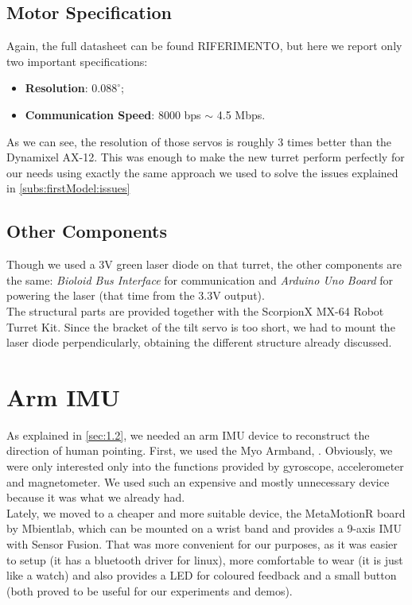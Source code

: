 \subsection{Motor Specification}
Again, the full datasheet can be found RIFERIMENTO, but here we report only two important specifications:
\begin{itemize}
    \item \textbf{Resolution}: $0.088^{\circ}$;
    \item \textbf{Communication Speed}: 8000 bps $\sim$ 4.5 Mbps.
\end{itemize}
As we can see, the resolution of those servos is roughly 3 times better than the Dynamixel AX-12. This was enough to make the new turret perform perfectly for our needs using exactly the same approach we used to solve the issues explained in \ref{subs:firstModel:issues}
\subsection{Other Components}
Though we used a 3V green laser diode on that turret, the other components are the same: \emph{Bioloid Bus Interface} for communication and \emph{Arduino Uno Board} for powering the laser (that time from the 3.3V output).\\
The structural parts are provided together with the ScorpionX MX-64 Robot Turret Kit. Since the bracket of the tilt servo is too short, we had to mount the laser diode perpendicularly, obtaining the different structure already discussed.
\section{Arm IMU}
As explained in \ref{sec:1.2}, we needed an arm IMU device to reconstruct the direction of human pointing. First, we used the Myo Armband, . Obviously, we were only interested only into the functions provided by gyroscope, accelerometer and magnetometer. We used such an expensive and mostly unnecessary device because it was what we already had.\\ Lately, we moved to a cheaper and more suitable device, the MetaMotionR board by Mbientlab, which can be mounted on a wrist band and provides a 9-axis IMU with Sensor Fusion. That was more convenient for our purposes, as it was easier to setup (it has a bluetooth driver for linux), more comfortable to wear (it is just like a watch) and also provides a LED for coloured feedback and a small button (both proved to be useful for our experiments and demos).
